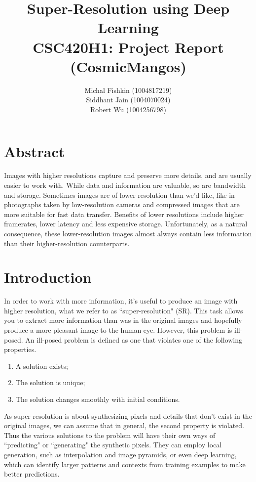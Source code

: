 \documentclass[letterpaper,12pt]{article}
\begin{document}
\title{\textbf{Super-Resolution using Deep Learning} \\ CSC420H1: Project Report (CosmicMangos)}


\author{Michal Fishkin (1004817219) \\ Siddhant Jain (1004070024) \\ Robert Wu (1004256798)}

\maketitle

\section*{Abstract}
Images with higher resolutions capture and preserve more details, and are usually easier to work with. While data and information are valuable, so are bandwidth and storage. Sometimes images are of lower resolution than we'd like, like in photographs taken by low-resolution cameras and compressed images that are more suitable for fast data transfer. Benefits of lower resolutions include higher framerates, lower latency and less expensive storage. Unfortunately, as a natural consequence, these lower-resolution images almost always contain less information than their higher-resolution counterparts.

\section*{Introduction}

In order to work with more information, it's useful to produce an image with higher resolution, what we refer to as ``super-resolution" (SR). This task allows you to extract more information than was in the original images and hopefully produce a more pleasant image to the human eye. However, this problem is ill-posed. An ill-posed problem is defined as one that violates one of the following properties.

\begin{enumerate}
    \item A solution exists;
    \item The solution is unique;
    \item The solution changes smoothly with initial conditions.
\end{enumerate}

As super-resolution is about synthesizing pixels and details that don't exist in the original images, we can assume that in general, the second property is violated. Thus the various solutions to the problem will have their own ways of ``predicting" or ``generating" the synthetic pixels. They can employ local generation, such as interpolation and image pyramids, or even deep learning, which can identify larger patterns and contexts from training examples to make better predictions.
\end{document}
